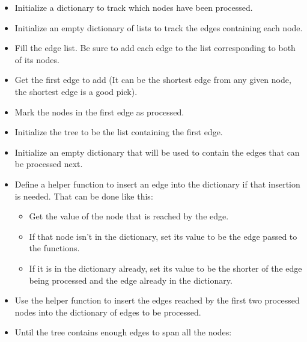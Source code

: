 \begin{itemize}


\item Initialize a dictionary to track which nodes have been processed.

\item Initialize an empty dictionary of lists to track the edges containing each node.

\item Fill the edge list.
	Be sure to add each edge to the list corresponding to both of its nodes.

\item Get the first edge to add (It can be the shortest edge from any given node, the shortest edge is a good pick).

\item Mark the nodes in the first edge as processed.

\item Initialize the tree to be the list containing the first edge.

\item Initialize an empty dictionary that will be used to contain the edges that can be processed next.

\item Define a helper function to insert an edge into the dictionary  if that insertion is needed.
	That can be done like this:

	\begin{itemize}

	\item Get the value of the node that is reached by the edge.

	\item If that node isn't in the dictionary, set its value to be the edge passed to the functions.

	\item If it is in the dictionary already, set its value to be the shorter of the edge being processed and the edge already in the dictionary.

	\end{itemize}

\item Use the helper function to insert the edges reached by the first two processed nodes into the dictionary of edges to be processed.

\item Until the tree contains enough edges to span all the nodes:


\end{itemize}

